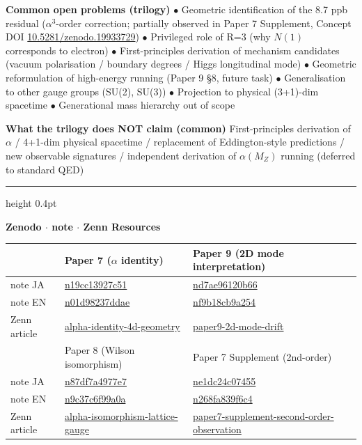 \documentclass[9pt,a4paper]{article}
\begin{document}
\textbf{\small Common open problems (trilogy)}\enspace
{\footnotesize $\bullet$ Geometric identification of the 8.7 ppb residual ($\alpha^3$-order correction; partially observed in Paper 7 Supplement, Concept DOI \href{https://doi.org/10.5281/zenodo.19933729}{10.5281/zenodo.19933729})\enspace
$\bullet$ Privileged role of R=3 (why $N(1)$ corresponds to electron)\enspace
$\bullet$ First-principles derivation of mechanism candidates (vacuum polarisation / boundary degrees / Higgs longitudinal mode)\enspace
$\bullet$ Geometric reformulation of high-energy running (Paper 9 §8, future task)\enspace
$\bullet$ Generalisation to other gauge groups (SU(2), SU(3))\enspace
$\bullet$ Projection to physical (3+1)-dim spacetime\enspace
$\bullet$ Generational mass hierarchy out of scope}

\smallskip
\textbf{\small What the trilogy does NOT claim (common)}\enspace
{\footnotesize First-principles derivation of $\alpha$ / 4+1-dim physical spacetime / replacement of Eddington-style predictions / new observable signatures / independent derivation of $\alpha(M_Z)$ running (deferred to standard QED)}

\vspace{3pt}
\hrule height 0.4pt
\vspace{3pt}

\begin{center}
{\footnotesize\textbf{Zenodo $\cdot$ note $\cdot$ Zenn Resources}}
\end{center}

\vspace{1pt}
{\footnotesize
\begin{tabular}{@{}lll@{}}
\toprule
& Paper 7 ($\alpha$ identity) & Paper 9 (2D mode interpretation) \\
\midrule
note JA & \href{https://note.com/kiharanoriaki/n/n19cc13927c51}{n19cc13927c51} & \href{https://note.com/kiharanoriaki/n/nd7ae96120b66}{nd7ae96120b66} \\
note EN & \href{https://note.com/kiharanoriaki/n/n01d98237ddae}{n01d98237ddae} & \href{https://note.com/kiharanoriaki/n/nf9b18cb9a254}{nf9b18cb9a254} \\
Zenn article & \href{https://zenn.dev/noriaki_kihara/articles/alpha-identity-4d-geometry}{alpha-identity-4d-geometry} & \href{https://zenn.dev/noriaki_kihara/articles/paper9-2d-mode-drift}{paper9-2d-mode-drift} \\
\midrule
& Paper 8 (Wilson isomorphism) & Paper 7 Supplement (2nd-order) \\
\midrule
note JA & \href{https://note.com/kiharanoriaki/n/n87df7a4977e7}{n87df7a4977e7} & \href{https://note.com/kiharanoriaki/n/ne1dc24c07455}{ne1dc24c07455} \\
note EN & \href{https://note.com/kiharanoriaki/n/n9c37c6f99a0a}{n9c37c6f99a0a} & \href{https://note.com/kiharanoriaki/n/n268fa839f6c4}{n268fa839f6c4} \\
Zenn article & \href{https://zenn.dev/noriaki_kihara/articles/alpha-isomorphism-lattice-gauge}{alpha-isomorphism-lattice-gauge} & \href{https://zenn.dev/noriaki_kihara/articles/paper7-supplement-second-order-observation}{paper7-supplement-second-order-observation} \\
\bottomrule
\end{tabular}
}
\end{document}
